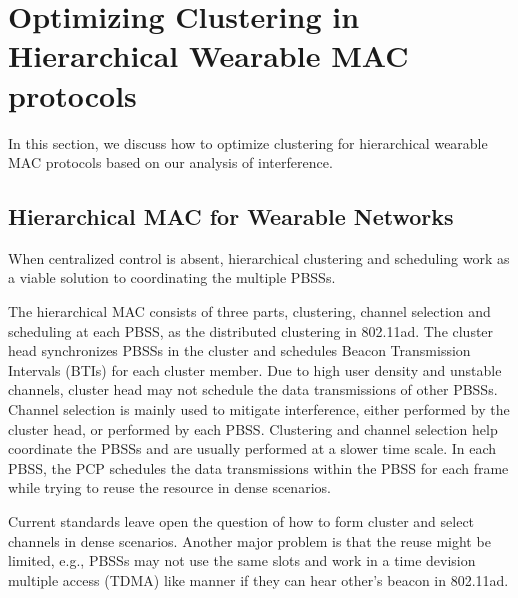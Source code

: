 \documentclass[10pt, conference, letterpaper]{IEEEtran}
\begin{document}

\section{Optimizing Clustering in Hierarchical Wearable MAC protocols}\label{section:clustering}
In this section, we discuss how to optimize clustering for hierarchical wearable MAC protocols based on our analysis of interference.

\subsection{Hierarchical MAC for Wearable Networks}\label{section:clustering:hierarchy}

When centralized control is absent, hierarchical clustering and scheduling work as a viable solution to coordinating the multiple PBSSs. 


The hierarchical MAC consists of three parts, clustering, channel selection and scheduling at each PBSS, as the distributed clustering in 802.11ad. 
The cluster head synchronizes PBSSs in the cluster and schedules Beacon Transmission Intervals (BTIs) for each cluster member. 
Due to high user density and unstable channels, cluster head may not schedule the data transmissions of other PBSSs.
Channel selection is mainly used to mitigate interference, either performed by the cluster head, or performed by each PBSS. 
Clustering and channel selection help coordinate the PBSSs and are usually performed at a slower time scale. 
In each PBSS, the PCP schedules the data transmissions within the PBSS for each frame while trying to reuse the resource in dense scenarios. 


Current standards leave open the question of how to form cluster and select channels in dense scenarios. 
Another major problem is that the reuse might be limited, e.g., PBSSs may not use the same slots and work in a time devision multiple access (TDMA) like manner if they can hear other's beacon in 802.11ad.
\end{document}
